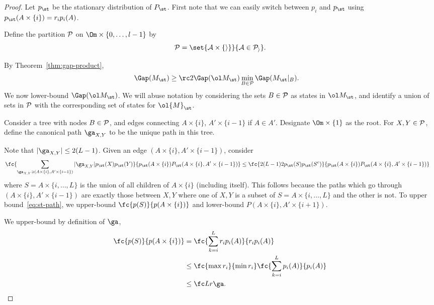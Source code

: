 \begin{proof}
Let $p_{\st}$ be the stationary distribution of $P_{\st}$.
First note that we can easily switch between $p_i$ and $p_{\st}$ using $p_{\st}(A\times \{i\}) = r_i p_i(A)$. 

Define the partition $\cal P$ on $\Om\times \{0,\ldots, l-1\}$ by 
$$
\cal P = \set{A\times \{i\}}{A\in \cal P_i}.
$$

By Theorem~\ref{thm:gap-product},
\begin{align}\label{eq:st-gap-prod}
\Gap(M_{\st}) & \ge \rc2 \Gap(\ol M_{\st}) 
\min_{B\in \cal P}\Gap(M_{\st}|_B).
\end{align}
We now lower-bound $\Gap(\ol M_{\st}) $. We will abuse notation by considering the sets $B\in \cal P$ as states in $\ol M_{\st}$, and identify a union of sets in $\cal P$ with the corresponding set of states for $\ol{M}_{\st}$. 

Consider a tree with nodes $B\in \cal P$, and edges connecting $A\times\{i\}$, $A'\times\{i-1\}$ if $A\in A'$. Designate $\Om\times \{1\}$ as the root. For $X,Y\in \cal P$, define the canonical path $\ga_{X,Y}$ to be the unique path in this tree.

Note that $|\ga_{X,Y}|\le 2(L-1)$. Given an edge $(A\times\{i\},A'\times\{i-1\})$, consider
\begin{align}\label{eq:st-path}
\fc{\sum_{\ga_{X,Y}\ni(A\times\{i\},A'\times\{i-1\})} |\ga_{X,Y}|p_{\st}(X)p_{\st}(Y)}{p_{\st}(A\times\{i\})P_{\st}(A\times\{i\},A'\times\{i-1\})}
&\le \fc{2(L-1) 2p_{\st}(S)p_{\st}(S^c)}{p_{\st}(A\times\{i\})P_{\st}(A\times\{i\},A'\times\{i-1\})}
\end{align}
where $S= A\times \{i,\ldots,L\}$ is the union of all children of $A\times \{i\}$ (including itself). This follows because the paths which go through $(A\times\{i\},A'\times\{i-1\})$ are exactly those between $X,Y$ where one of $X,Y$ is a subset of $S= A\times \{i,\ldots, L\}$ and the other is not. To upper bound~\eqref{eq:st-path}, we upper-bound $\fc{p(S)}{p(A\times \{i\})}$ and lower-bound $P(A\times \{i\}, A'\times \{i+1\})$. 

We upper-bound by definition of $\ga$,
\begin{align}
\fc{p(S)}{p(A\times \{i\})} &= \fc{\sum_{k=i}^{L} r_ip_i(A)}{r_ip_i(A)}\\
&\le\fc{\max r_i}{\min r_i}
 \fc{\sum_{k=i}^{L} p_i(A)}{p_i(A)}\\
&\le \fc L{r\ga}.
\label{eq:path-bd1}
\end{align}


\end{proof}

